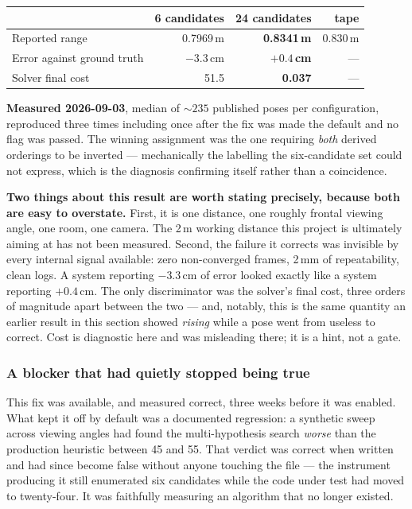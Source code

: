 \documentclass[11pt]{article}
\begin{document}
\begin{center}
\begin{tabular}{@{}lrrr@{}}
\toprule
 & 6 candidates & 24 candidates & tape \\
\midrule
Reported range & 0.7969\,m & \textbf{0.8341\,m} & 0.830\,m \\
Error against ground truth & $-3.3$\,cm & \textbf{$+0.4$\,cm} & --- \\
Solver final cost & 51.5 & \textbf{0.037} & --- \\
\bottomrule
\end{tabular}
\end{center}

\textbf{Measured 2026-09-03}, median of ${\sim}235$ published poses per
configuration, reproduced three times including once after the fix was made
the default and no flag was passed. The winning assignment was the one
requiring \emph{both} derived orderings to be inverted --- mechanically the
labelling the six-candidate set could not express, which is the diagnosis
confirming itself rather than a coincidence.

\textbf{Two things about this result are worth stating precisely, because
both are easy to overstate.} First, it is one distance, one roughly frontal
viewing angle, one room, one camera. The 2\,m working distance this project
is ultimately aiming at has not been measured. Second, the failure it
corrects was invisible by every internal signal available: zero
non-converged frames, 2\,mm of repeatability, clean logs. A system reporting
$-3.3$\,cm of error looked exactly like a system reporting $+0.4$\,cm. The
only discriminator was the solver's final cost, three orders of magnitude
apart between the two --- and, notably, this is the same quantity an earlier
result in this section showed \emph{rising} while a pose went from useless
to correct. Cost is diagnostic here and was misleading there; it is a hint,
not a gate.

\subsubsection*{A blocker that had quietly stopped being true}

This fix was available, and measured correct, three weeks before it was
enabled. What kept it off by default was a documented regression: a
synthetic sweep across viewing angles had found the multi-hypothesis search
\emph{worse} than the production heuristic between 45\textdegree{} and
55\textdegree{}. That verdict was correct when written and had since become
false without anyone touching the file --- the instrument producing it still
enumerated six candidates while the code under test had moved to
twenty-four. It was faithfully measuring an algorithm that no longer
existed.
\end{document}
